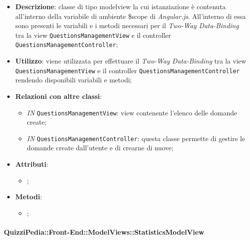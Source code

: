 \begin{itemize}
	\item \textbf{Descrizione}: classe di tipo modelview la cui istanziazione è contenuta all'interno della variabile di ambiente \$scope di \textit{Angular.js}. All'interno di essa sono presenti le variabili e i metodi necessari per il \textit{Two-Way Data-Binding} tra la view \texttt{QuestionsManagementView} e il controller \texttt{QuestionsManagementController};
	\item \textbf{Utilizzo}: viene utilizzata per effettuare il \textit{Two-Way Data-Binding} tra la view \texttt{QuestionsManagementView} e il controller \texttt{QuestionsManagementController} rendendo disponibili variabili e metodi;
	\item \textbf{Relazioni con altre classi}: 
	\begin{itemize}
		\item \textit{IN} \texttt{QuestionsManagementView}: view contenente l’elenco delle domande create; 
		\item \textit{IN} \texttt{QuestionsManagementController}: questa classe permette di gestire le domande create dall’utente e di crearne di nuove;
	\end{itemize}
	\item \textbf{Attributi}: 
	\begin{itemize}
		\item ;
	\end{itemize}
	\item \textbf{Metodi}: 
	\begin{itemize}
		\item ;
	\end{itemize}
\end{itemize}	

\paragraph{QuizziPedia::Front-End::ModelViews::StatisticsModelView}

\label{QuizziPedia::Front-End::ModelViews::StatisticsModelView}


